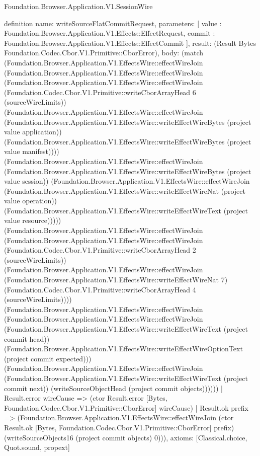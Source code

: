 \begin{lexlean}{Foundation.Browser.Application.V1.SessionWire}
\begin{semanticmodule}
definition{
  name: writeSourceFlatCommitRequest,
  parameters: [
    value : Foundation.Browser.Application.V1.Effects::EffectRequest,
    commit : Foundation.Browser.Application.V1.Effects::EffectCommit
  ],
  result: (Result Bytes Foundation.Codec.Cbor.V1.Primitive::CborError),
  body: (match (Foundation.Browser.Application.V1.EffectsWire::effectWireJoin (Foundation.Browser.Application.V1.EffectsWire::effectWireJoin (Foundation.Browser.Application.V1.EffectsWire::effectWireJoin (Foundation.Codec.Cbor.V1.Primitive::writeCborArrayHead 6 (sourceWireLimits)) (Foundation.Browser.Application.V1.EffectsWire::effectWireJoin (Foundation.Browser.Application.V1.EffectsWire::writeEffectWireBytes (project value application)) (Foundation.Browser.Application.V1.EffectsWire::writeEffectWireBytes (project value manifest)))) (Foundation.Browser.Application.V1.EffectsWire::effectWireJoin (Foundation.Browser.Application.V1.EffectsWire::writeEffectWireBytes (project value session)) (Foundation.Browser.Application.V1.EffectsWire::effectWireJoin (Foundation.Browser.Application.V1.EffectsWire::writeEffectWireNat (project value operation)) (Foundation.Browser.Application.V1.EffectsWire::writeEffectWireText (project value resource))))) (Foundation.Browser.Application.V1.EffectsWire::effectWireJoin (Foundation.Browser.Application.V1.EffectsWire::effectWireJoin (Foundation.Codec.Cbor.V1.Primitive::writeCborArrayHead 2 (sourceWireLimits)) (Foundation.Browser.Application.V1.EffectsWire::effectWireJoin (Foundation.Browser.Application.V1.EffectsWire::writeEffectWireNat 7) (Foundation.Codec.Cbor.V1.Primitive::writeCborArrayHead 4 (sourceWireLimits)))) (Foundation.Browser.Application.V1.EffectsWire::effectWireJoin (Foundation.Browser.Application.V1.EffectsWire::effectWireJoin (Foundation.Browser.Application.V1.EffectsWire::writeEffectWireText (project commit head)) (Foundation.Browser.Application.V1.EffectsWire::writeEffectWireOptionText (project commit expected))) (Foundation.Browser.Application.V1.EffectsWire::effectWireJoin (Foundation.Browser.Application.V1.EffectsWire::writeEffectWireText (project commit next)) (writeSourceObjectHead (project commit objects))))))
    | Result.error wireCause => (ctor Result.error [Bytes, Foundation.Codec.Cbor.V1.Primitive::CborError] wireCause)
    | Result.ok prefix => (Foundation.Browser.Application.V1.EffectsWire::effectWireJoin (ctor Result.ok [Bytes, Foundation.Codec.Cbor.V1.Primitive::CborError] prefix) (writeSourceObjects16 (project commit objects) 0))),
  axioms: [Classical.choice, Quot.sound, propext]
}


\end{semanticmodule}
\end{lexlean}
